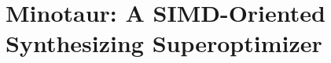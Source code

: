\chapter{Minotaur: A SIMD-Oriented Synthesizing Superoptimizer}

\newcommand{\minotaur}{Minotaur}







